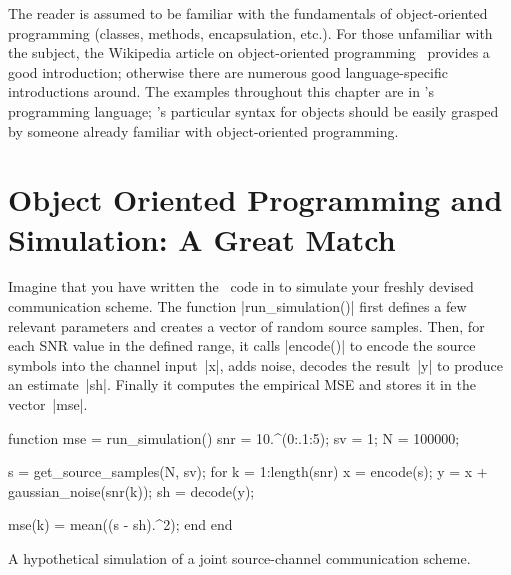\begin{remark}
  \label{rem:oofundamentals}
  The reader is assumed to be familiar with the fundamentals of object-oriented
  programming (classes, methods, encapsulation, etc.). For those unfamiliar with
  the subject, the Wikipedia article on object-oriented
  programming~\cite{wiki:ooprogramming} provides a good introduction; otherwise
  there are numerous good language-specific introductions around. The examples
  throughout this chapter are in \matlab's programming language; \matlab's
  particular syntax for objects should be easily grasped by someone already
  familiar with object-oriented programming.
\end{remark}

\DefineShortVerb{\|}

\section[Object Oriented Programming for Simulations]{Object Oriented
Programming and Simulation: A Great Match}\label{sec:ooforsim}

Imagine that you have written the \matlab\ code in
 to
simulate your freshly devised communication scheme. The function
|run_simulation()| first defines a few relevant parameters and creates a vector
of random source samples. Then, for each SNR value in the defined range, it
calls |encode()| to encode the source symbols into the channel input~|x|, adds
noise, decodes the result~|y|  to produce an estimate~|sh|.  Finally it computes
the empirical MSE and stores it in the vector~|mse|.

\begin{listing}
\begin{Code}
  function mse = run_simulation()
    snr = 10.^(0:.1:5);   %
    sv  = 1;              %
    N   = 100000;         %
    
    s = get_source_samples(N, sv);
    for k = 1:length(snr)
      x  = encode(s);
      y  = x + gaussian_noise(snr(k));
      sh = decode(y);
      
      mse(k) = mean((s - sh).^2);
    end
  end
\end{Code}
\caption{A hypothetical simulation of a joint source-channel communication
scheme.}
\label{lst:proceduralsim}
\end{listing}


